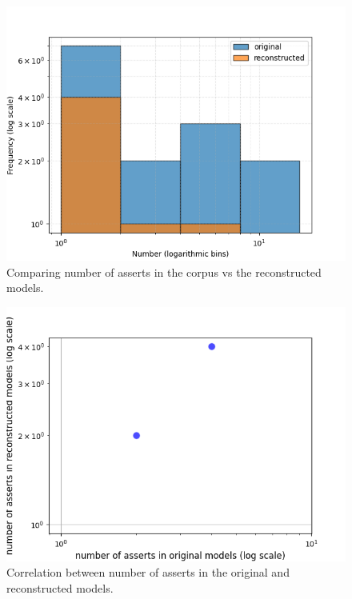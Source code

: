 \begin{figure}[htbp]
\centerline{\includegraphics[width=\linewidth]{"./Comparing number of asserts in the corpus vs the reconstructed models.png"}}
\caption{Comparing number of asserts in the corpus vs the reconstructed models.}
\label{fig}
\end{figure}


\begin{figure}[htbp]
\centerline{\includegraphics[width=\linewidth]{"./Correlation between number of asserts in the original and reconstructed models.png"}}
\caption{Correlation between number of asserts in the original and reconstructed models.}
\label{fig}
\end{figure}



